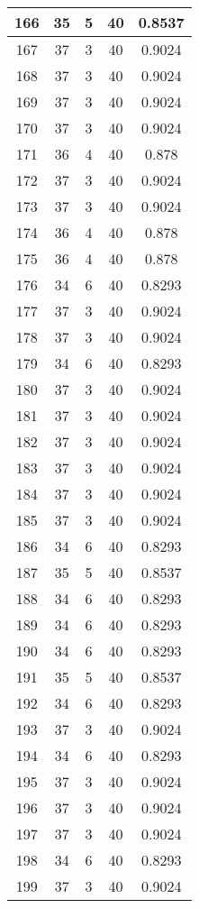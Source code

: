 \documentclass[letterpaper, 12pt]{article}
\begin{document}
\begin{longtable}{|c|c|c|c|c|}
\hline
166 & 35 & 5 & 40 & 0.8537 \\
\hline
167 & 37 & 3 & 40 & 0.9024 \\
\hline
168 & 37 & 3 & 40 & 0.9024 \\
\hline
169 & 37 & 3 & 40 & 0.9024 \\
\hline
170 & 37 & 3 & 40 & 0.9024 \\
\hline
171 & 36 & 4 & 40 & 0.878 \\
\hline
172 & 37 & 3 & 40 & 0.9024 \\
\hline
173 & 37 & 3 & 40 & 0.9024 \\
\hline
174 & 36 & 4 & 40 & 0.878 \\
\hline
175 & 36 & 4 & 40 & 0.878 \\
\hline
176 & 34 & 6 & 40 & 0.8293 \\
\hline
177 & 37 & 3 & 40 & 0.9024 \\
\hline
178 & 37 & 3 & 40 & 0.9024 \\
\hline
179 & 34 & 6 & 40 & 0.8293 \\
\hline
180 & 37 & 3 & 40 & 0.9024 \\
\hline
181 & 37 & 3 & 40 & 0.9024 \\
\hline
182 & 37 & 3 & 40 & 0.9024 \\
\hline
183 & 37 & 3 & 40 & 0.9024 \\
\hline
184 & 37 & 3 & 40 & 0.9024 \\
\hline
185 & 37 & 3 & 40 & 0.9024 \\
\hline
186 & 34 & 6 & 40 & 0.8293 \\
\hline
187 & 35 & 5 & 40 & 0.8537 \\
\hline
188 & 34 & 6 & 40 & 0.8293 \\
\hline
189 & 34 & 6 & 40 & 0.8293 \\
\hline
190 & 34 & 6 & 40 & 0.8293 \\
\hline
191 & 35 & 5 & 40 & 0.8537 \\
\hline
192 & 34 & 6 & 40 & 0.8293 \\
\hline
193 & 37 & 3 & 40 & 0.9024 \\
\hline
194 & 34 & 6 & 40 & 0.8293 \\
\hline
195 & 37 & 3 & 40 & 0.9024 \\
\hline
196 & 37 & 3 & 40 & 0.9024 \\
\hline
197 & 37 & 3 & 40 & 0.9024 \\
\hline
198 & 34 & 6 & 40 & 0.8293 \\
\hline
199 & 37 & 3 & 40 & 0.9024 \\
\hline
\end{longtable}
\end{document}
